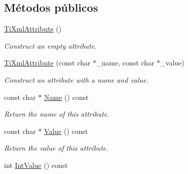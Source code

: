 \subsection*{\-Métodos públicos}
\begin{DoxyCompactItemize}
\item 
\hypertarget{classTiXmlAttribute_a9cfa3c8179873fd485d83003b114f8e1}{\hyperlink{classTiXmlAttribute_a9cfa3c8179873fd485d83003b114f8e1}{\-Ti\-Xml\-Attribute} ()}\label{classTiXmlAttribute_a9cfa3c8179873fd485d83003b114f8e1}

\begin{DoxyCompactList}\small\item\em \-Construct an empty attribute. \end{DoxyCompactList}\item 
\hypertarget{classTiXmlAttribute_a759d0b76fb8fcf765ecab243bc14f05e}{\hyperlink{classTiXmlAttribute_a759d0b76fb8fcf765ecab243bc14f05e}{\-Ti\-Xml\-Attribute} (const char $\ast$\-\_\-name, const char $\ast$\-\_\-value)}\label{classTiXmlAttribute_a759d0b76fb8fcf765ecab243bc14f05e}

\begin{DoxyCompactList}\small\item\em \-Construct an attribute with a name and value. \end{DoxyCompactList}\item 
\hypertarget{classTiXmlAttribute_a298a57287d305904ba6bd96ae6f78d3d}{const char $\ast$ \hyperlink{classTiXmlAttribute_a298a57287d305904ba6bd96ae6f78d3d}{\-Name} () const }\label{classTiXmlAttribute_a298a57287d305904ba6bd96ae6f78d3d}

\begin{DoxyCompactList}\small\item\em \-Return the name of this attribute. \end{DoxyCompactList}\item 
\hypertarget{classTiXmlAttribute_a0f874490eac8ca00ee0070765d0e97e3}{const char $\ast$ \hyperlink{classTiXmlAttribute_a0f874490eac8ca00ee0070765d0e97e3}{\-Value} () const }\label{classTiXmlAttribute_a0f874490eac8ca00ee0070765d0e97e3}

\begin{DoxyCompactList}\small\item\em \-Return the value of this attribute. \end{DoxyCompactList}\item 
\hypertarget{classTiXmlAttribute_aa1a20ad59dc7e89a0ab265396360d50f}{int \hyperlink{classTiXmlAttribute_aa1a20ad59dc7e89a0ab265396360d50f}{\-Int\-Value} () const }\label{classTiXmlAttribute_aa1a20ad59dc7e89a0ab265396360d50f}


\end{DoxyCompactItemize}
